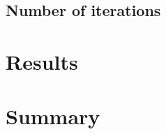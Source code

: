 \documentclass[thesis.tex]{subfiles}
\begin{document}
\subsection{Number of iterations}



\section{Results} \label{sec:C4-results}






\section{Summary} \label{sec:C4-summary}
\end{document}
